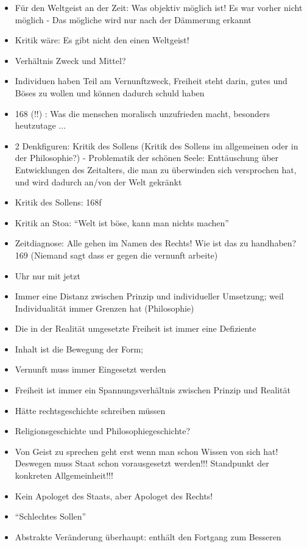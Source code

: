 \documentclass[emulatestandardclasses]{scrartcl}
\begin{document}
\begin{itemize}
  \item Für den Weltgeist an der Zeit: Was objektiv möglich ist! Es war vorher nicht möglich - Das mögliche wird nur nach der Dämmerung erkannt
  \item Kritik wäre: Es gibt nicht den einen Weltgeist! 
  \item Verhältnis Zweck und Mittel?
  \item Individuen haben Teil am Vernunftzweck, Freiheit steht darin, gutes und Böses zu wollen und können dadurch schuld haben
  \item 168 (!!) : Was die menschen moralisch unzufrieden macht, besonders heutzutage ...
  \item 2 Denkfiguren: Kritik des Sollens (Kritik des Sollens im allgemeinen oder in der Philosophie?) - Problematik der schönen Seele: Enttäuschung über Entwicklungen des Zeitalters, die man zu überwinden sich versprochen hat, und wird dadurch an/von der Welt gekränkt
  \item Kritik des Sollens: 168f
  \item Kritik an Stoa: "`Welt ist böse, kann man nichts machen"'
  \item Zeitdiagnose: Alle gehen im Namen des Rechts! Wie ist das zu handhaben? 169 (Niemand sagt dass er gegen die vernunft arbeite)
  \item Uhr nur mit jetzt
  \item Immer eine Distanz zwischen Prinzip und individueller Umsetzung; weil Individualität immer Grenzen hat (Philosophie)
  \item Die in der Realität umgesetzte Freiheit ist immer eine Defiziente
  \item Inhalt ist die Bewegung der Form; 
  \item Vernunft muss immer Eingesetzt werden
  \item Freiheit ist immer ein Spannungsverhältnis zwischen Prinzip und Realität
  \item Hätte rechtsgeschichte schreiben müssen
  \item Religionsgeschichte und Philosophiegeschichte?
  \item Von Geist zu sprechen geht erst wenn man schon Wissen von sich hat! Deswegen muss Staat schon vorausgesetzt werden!!! Standpunkt der konkreten Allgemeinheit!!!
  \item Kein Apologet des Staats, aber Apologet des Rechts!
  \item "`Schlechtes Sollen"' 
  \item Abstrakte Veränderung überhaupt: enthält den Fortgang zum Besseren
\end{itemize}
\end{document}
